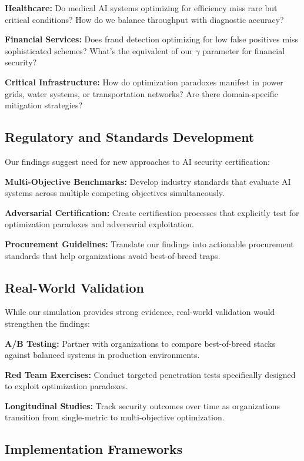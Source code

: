 \documentclass[10pt,conference]{IEEEtran}
\begin{document}
\textbf{Healthcare:} Do medical AI systems optimizing for efficiency miss rare but critical conditions? How do we balance throughput with diagnostic accuracy?

\textbf{Financial Services:} Does fraud detection optimizing for low false positives miss sophisticated schemes? What's the equivalent of our $\gamma$ parameter for financial security?

\textbf{Critical Infrastructure:} How do optimization paradoxes manifest in power grids, water systems, or transportation networks? Are there domain-specific mitigation strategies?

\subsection{Regulatory and Standards Development}

Our findings suggest need for new approaches to AI security certification:

\textbf{Multi-Objective Benchmarks:} Develop industry standards that evaluate AI systems across multiple competing objectives simultaneously.

\textbf{Adversarial Certification:} Create certification processes that explicitly test for optimization paradoxes and adversarial exploitation.

\textbf{Procurement Guidelines:} Translate our findings into actionable procurement standards that help organizations avoid best-of-breed traps.

\subsection{Real-World Validation}

While our simulation provides strong evidence, real-world validation would strengthen the findings:

\textbf{A/B Testing:} Partner with organizations to compare best-of-breed stacks against balanced systems in production environments.

\textbf{Red Team Exercises:} Conduct targeted penetration tests specifically designed to exploit optimization paradoxes.

\textbf{Longitudinal Studies:} Track security outcomes over time as organizations transition from single-metric to multi-objective optimization.

\subsection{Implementation Frameworks}
\end{document}
